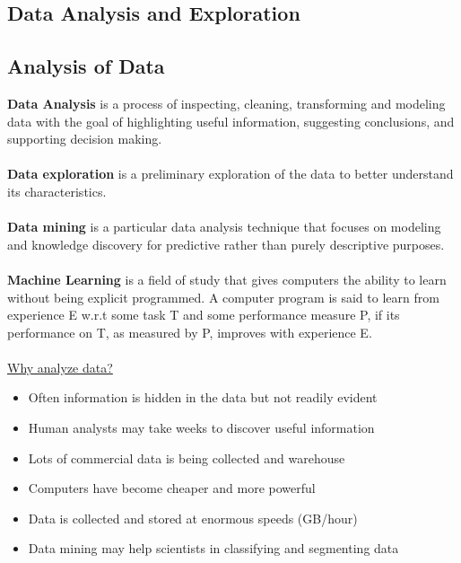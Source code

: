 \documentclass[10pt,a4paper]{article}
\newcommand{\nline}{\\~\\}
\begin{document}
\begin{justify}
\section{Data Analysis and Exploration}
\subsection{Analysis of Data}
\textbf{Data Analysis} is a process of inspecting, cleaning, transforming and modeling data with the goal of highlighting useful information, suggesting conclusions, and supporting decision making.
\nline
\textbf{Data exploration} is a preliminary exploration of the data to better understand its characteristics.
\nline
\textbf{Data mining} is a particular data analysis technique that focuses on modeling and knowledge discovery for predictive rather than purely descriptive purposes.
\nline
\textbf{Machine Learning} is a field of study that gives computers the ability to learn without being explicit programmed. A computer program is said to learn from experience E w.r.t some task T and some performance measure P, if its performance on T, as measured by P, improves with experience E.
\nline
\uline{Why analyze data?}
\begin{itemize}
	\item Often information is hidden in the data but not readily evident
	\item Human analysts may take weeks to discover useful information
	\item Lots of commercial data is being collected and warehouse
	\item Computers have become cheaper and more powerful
	\item Data is collected and stored at enormous speeds (GB/hour)
	\item Data mining may help scientists in classifying and segmenting data
\end{itemize}

\end{justify}
\end{document}
